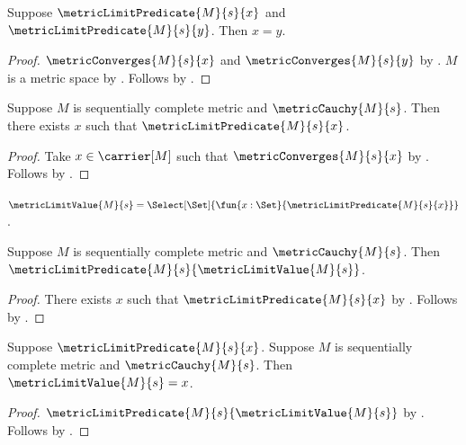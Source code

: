 \begin{proposition}\label{metric_limit_predicate_unique}
    Suppose $\metricLimitPredicate{M}{s}{x}$ and
        $\metricLimitPredicate{M}{s}{y}$.
    Then $x=y$.
\end{proposition}
\begin{proof}
    $\metricConverges{M}{s}{x}$ and $\metricConverges{M}{s}{y}$
        by .
    $M$ is a metric space by .
    Follows by .
\end{proof}

\begin{proposition}\label{metric_limit_predicate_inhabited_of_cauchy_complete}
    Suppose $M$ is sequentially complete metric and
        $\metricCauchy{M}{s}$.
    Then there exists $x$ such that $\metricLimitPredicate{M}{s}{x}$.
\end{proposition}
\begin{proof}
    Take $x\in\carrier[M]$ such that $\metricConverges{M}{s}{x}$
        by .
    Follows by .
\end{proof}

\begin{definition}\label{metric_limit_value}
    $\metricLimitValue{M}{s}=\Select[\Set]{
        \fun{x:\Set}{\metricLimitPredicate{M}{s}{x}}}$.
\end{definition}

\begin{theorem}\label{metric_limit_value_is_limit}
    Suppose $M$ is sequentially complete metric and
        $\metricCauchy{M}{s}$.
    Then $\metricLimitPredicate{M}{s}{\metricLimitValue{M}{s}}$.
\end{theorem}
\begin{proof}
    There exists $x$ such that $\metricLimitPredicate{M}{s}{x}$
        by .
    Follows by .
\end{proof}

\begin{theorem}\label{metric_limit_value_eq_of_limit}
    Suppose $\metricLimitPredicate{M}{s}{x}$.
    Suppose $M$ is sequentially complete metric and
        $\metricCauchy{M}{s}$.
    Then $\metricLimitValue{M}{s}=x$.
\end{theorem}
\begin{proof}
    $\metricLimitPredicate{M}{s}{\metricLimitValue{M}{s}}$
        by .
    Follows by .
\end{proof}

